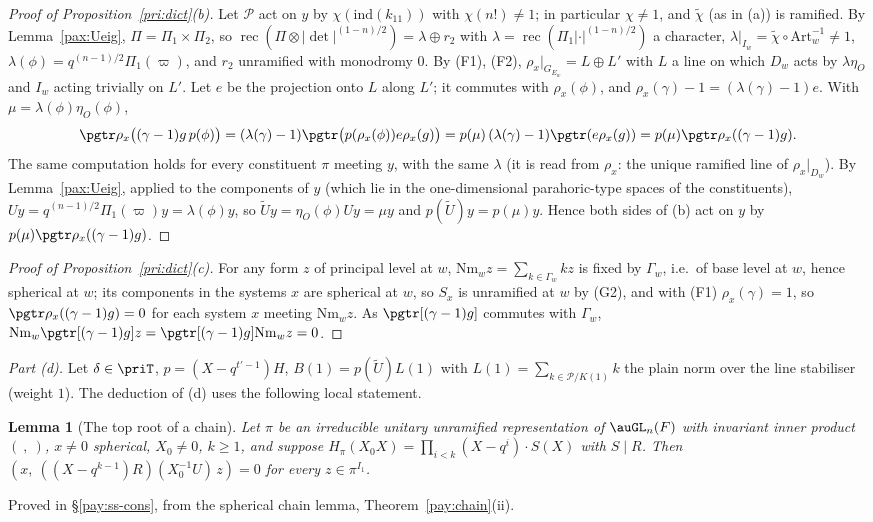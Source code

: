 \documentclass[10pt]{amsart}
\newtheorem{lemma}[theorem]{Lemma}
\theoremstyle{definition}
\theoremstyle{remark}
\begin{document}
\begin{proof}[Proof of Proposition~\ref{pri:dict}(b)]
Let $\mathcal P$ act on $y$ by $\chi(\mathrm{ind}(k_{11}))$ with $\chi(n!)\ne1$; in particular
$\chi\ne1$, and $\tilde\chi$ (as in (a)) is ramified. By Lemma~\ref{pax:Ueig}, $\Pi=\Pi_1\times\Pi_2$,
so $\operatorname{rec}(\Pi\otimes|\det|^{(1-n)/2})=\lambda\oplus r_2$ with $\lambda=
\operatorname{rec}(\Pi_1|\cdot|^{(1-n)/2})$ a character, $\lambda|_{I_w}=\tilde\chi\circ
\mathrm{Art}_w^{-1}\ne1$, $\lambda(\phi)=q^{(n-1)/2}\Pi_1(\varpi)$, and $r_2$ unramified with
monodromy $0$. By (F1), (F2), $\rho_x|_{G_{E_w}}=L\oplus L'$ with $L$ a line on which $D_w$ acts by
$\lambda\eta_O$ and $I_w$ acting trivially on $L'$. Let $e$ be the projection onto $L$ along $L'$;
it commutes with $\rho_x(\phi)$, and $\rho_x(\gamma)-1=(\lambda(\gamma)-1)e$. With $\mu=
\lambda(\phi)\eta_O(\phi)$,
\[
\pgtr\rho_x\bigl((\gamma-1)g\,p(\phi)\bigr)=(\lambda(\gamma)-1)\pgtr\bigl(p(\rho_x(\phi))e\rho_x(g)
\bigr)=p(\mu)\,(\lambda(\gamma)-1)\pgtr(e\rho_x(g))=p(\mu)\pgtr\rho_x((\gamma-1)g).
\]
The same computation holds for every constituent $\pi$ meeting $y$, with the same $\lambda$ (it is
read from $\rho_x$: the unique ramified line of $\rho_x|_{D_w}$). By Lemma~\ref{pax:Ueig}, applied
to the components of $y$ (which lie in the one-dimensional parahoric-type spaces of the constituents),
$Uy=q^{(n-1)/2}\Pi_1(\varpi)y=\lambda(\phi)y$, so $\tilde Uy=\eta_O(\phi)Uy=\mu y$ and $p(\tilde U)y=
p(\mu)y$. Hence both sides of (b) act on $y$ by $p(\mu)\pgtr\rho_x((\gamma-1)g)$.
\end{proof}

\begin{proof}[Proof of Proposition~\ref{pri:dict}(c)]
For any form $z$ of principal level at $w$, $\mathrm{Nm}_wz=\sum_{k\in\Gamma_w}kz$ is fixed by
$\Gamma_w$, i.e.\ of base level at $w$, hence spherical at $w$; its components in the systems $x$
are spherical at $w$, so $S_x$ is unramified at $w$ by (G2), and with (F1) $\rho_x(\gamma)=1$, so
$\pgtr\rho_x((\gamma-1)g)=0$ for each system $x$ meeting $\mathrm{Nm}_wz$. As $\pgtr[(\gamma-1)g]$
commutes with $\Gamma_w$, $\mathrm{Nm}_w\pgtr[(\gamma-1)g]z=\pgtr[(\gamma-1)g]\mathrm{Nm}_wz=0$.
\end{proof}

\emph{Part (d).} Let $\delta\in\priT$, $p=(X-q^{t'-1})H$, $B(1)=p(\tilde U)L(1)$ with $L(1)=
\sum_{k\in\mathcal P/K(1)}k$ the plain norm over the line stabiliser (weight $1$). The
deduction of (d) uses the following local statement.

\begin{lemma}[The top root of a chain]\label{pax:toproot}
Let $\pi$ be an irreducible unitary unramified representation of $\auGL_n(F)$ with invariant inner
product $(\ ,\ )$, $x\ne0$ spherical, $X_0\ne0$, $k\ge1$, and suppose $H_\pi(X_0X)=\prod_{i<k}(X-q^i)
\cdot S(X)$ with $S\mid R$. Then $(x,\ ((X-q^{k-1})R)(X_0^{-1}U)\,z)=0$ for every $z\in\pi^{I_1}$.
\end{lemma}
\noindent Proved in \S\ref{pay:ss-cons}, from the spherical chain lemma,
Theorem~\ref{pay:chain}(ii).\par\smallskip
\end{document}
